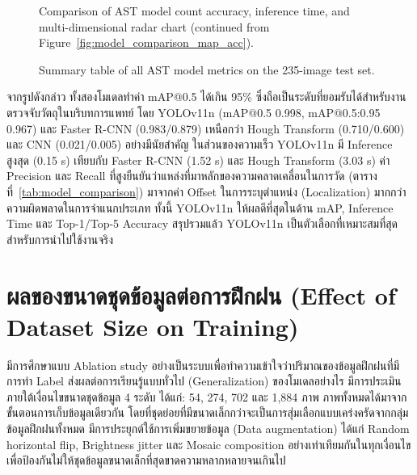 \begin{figure}[H]
  \centering
  \caption[AST model comparison: count accuracy, inference time, and radar chart]{Comparison of AST model count accuracy, inference time, and multi-dimensional radar chart (continued from Figure~\ref{fig:model_comparison_map_acc}).}
  \label{fig:model_comparison_cnt_time_radar}
\end{figure}

\begin{figure}[H]
  \centering
  \caption{Summary table of all AST model metrics on the 235-image test set.}
  \label{fig:model_comparison_summary_table}
\end{figure}

จากรูปดังกล่าว ทั้งสองโมเดลทำค่า mAP@0.5 ได้เกิน 95\% ซึ่งถือเป็นระดับที่ยอมรับได้สำหรับงานตรวจจับวัตถุในบริบทการแพทย์ โดย YOLOv11n (mAP@0.5 0.998, mAP@0.5:0.95 0.967) และ Faster R-CNN (0.983/0.879) เหนือกว่า Hough Transform (0.710/0.600) และ CNN (0.021/0.005) อย่างมีนัยสำคัญ ในส่วนของความเร็ว YOLOv11n มี Inference สูงสุด (0.15 s) เทียบกับ Faster R-CNN (1.52 s) และ Hough Transform (3.03 s) ค่า Precision และ Recall ที่สูงยืนยันว่าแหล่งที่มาหลักของความคลาดเคลื่อนในการวัด (ตารางที่~\ref{tab:model_comparison}) มาจากค่า Offset ในการระบุตำแหน่ง (Localization) มากกว่าความผิดพลาดในการจำแนกประเภท ทั้งนี้ YOLOv11n ให้ผลดีที่สุดในด้าน mAP, Inference Time และ Top-1/Top-5 Accuracy สรุปรวมแล้ว YOLOv11n เป็นตัวเลือกที่เหมาะสมที่สุดสำหรับการนำไปใช้งานจริง

\section{ผลของขนาดชุดข้อมูลต่อการฝึกฝน (Effect of Dataset Size on Training)}
\label{sec:dataset_size}

มีการศึกษาแบบ Ablation study อย่างเป็นระบบเพื่อทำความเข้าใจว่าปริมาณของข้อมูลฝึกฝนที่มีการทำ Label ส่งผลต่อการเรียนรู้แบบทั่วไป (Generalization) ของโมเดลอย่างไร
มีการประเมินภายใต้เงื่อนไขขนาดชุดข้อมูล 4 ระดับ ได้แก่: 54, 274, 702 และ 1,884 ภาพ
ภาพทั้งหมดได้มาจากขั้นตอนการเก็บข้อมูลเดียวกัน โดยที่ชุดย่อยที่มีขนาดเล็กกว่าจะเป็นการสุ่มเลือกแบบเคร่งครัดจากกลุ่มข้อมูลฝึกฝนทั้งหมด
มีการประยุกต์ใช้การเพิ่มขยายข้อมูล (Data augmentation) ได้แก่ Random horizontal flip, Brightness jitter และ Mosaic composition อย่างเท่าเทียมกันในทุกเงื่อนไข เพื่อป้องกันไม่ให้ชุดข้อมูลขนาดเล็กที่สุดขาดความหลากหลายจนเกินไป

